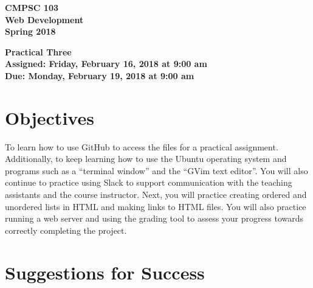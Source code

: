\documentclass[11pt]{article}
\newcommand{\assignmentduedate}{February 19}
\newcommand{\assignmentassignedate}{February 16}
\newcommand{\assignmentnumber}{Three}
\newcommand{\labyear}{2018}
\newcommand{\labdueday}{Monday}
\newcommand{\labassignday}{Friday}
\newcommand{\labtime}{9:00 am}
\newcommand{\assigneddate}{Assigned: \labassignday, \assignmentassignedate, \labyear{} at \labtime{}}
\newcommand{\duedate}{Due: \labdueday, \assignmentduedate, \labyear{} at \labtime{}}
\newcommand{\labtitle}[1]
{
  \begin{center}
    \begin{center}
      \bf
      CMPSC 103\\Web Development\\
      Spring 2018\\
      \medskip
    \end{center}
    \bf
    #1
  \end{center}
}
\begin{document}
\thispagestyle{empty}

\labtitle{Practical \assignmentnumber{} \\ \assigneddate{} \\ \duedate{}}

\section*{Objectives}

To learn how to use GitHub to access the files for a practical assignment.
Additionally, to keep learning how to use the Ubuntu operating system and
programs such as a ``terminal window'' and the ``GVim text editor''. You will
also continue to practice using Slack to support communication with the teaching
assistants and the course instructor. Next, you will practice creating ordered
and unordered lists in HTML and making links to HTML files. You will also
practice running a web server and using the grading tool to assess your progress
towards correctly completing the project.

\section*{Suggestions for Success}
\end{document}

